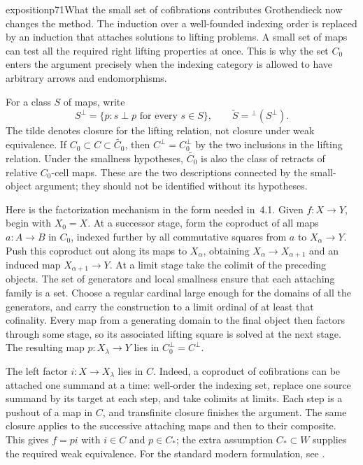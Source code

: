 \begin{dcomment}{exposition}{p71}{What the small set of cofibrations contributes}
Grothendieck now changes the method. The induction over a well-founded indexing order is replaced by an induction that attaches solutions to lifting problems. A small set of maps can test all the required right lifting properties at once. This is why the set $C_0$ enters the argument precisely when the indexing category is allowed to have arbitrary arrows and endomorphisms.

For a class $S$ of maps, write
\[
 S^{\perp}=\{p:s\mathrel{\perp}p\text{ for every }s\in S\},
 \qquad
 \widetilde S={}^{\perp}(S^{\perp}).
\]
The tilde denotes closure for the lifting relation, not closure under weak equivalence. If $C_0\subset C\subset\widetilde{C_0}$, then $C^{\perp}=C_0^{\perp}$ by the two inclusions in the lifting relation. Under the smallness hypotheses, $\widetilde{C_0}$ is also the class of retracts of relative $C_0$-cell maps. These are the two descriptions connected by the small-object argument; they should not be identified without its hypotheses.

Here is the factorization mechanism in the form needed in~4.1. Given $f:X\to Y$, begin with $X_0=X$. At a successor stage, form the coproduct of all maps $a:A\to B$ in $C_0$, indexed further by all commutative squares from $a$ to $X_\alpha\to Y$. Push this coproduct out along its maps to $X_\alpha$, obtaining $X_\alpha\to X_{\alpha+1}$ and an induced map $X_{\alpha+1}\to Y$. At a limit stage take the colimit of the preceding objects. The set of generators and local smallness ensure that each attaching family is a set. Choose a regular cardinal large enough for the domains of all the generators, and carry the construction to a limit ordinal of at least that cofinality. Every map from a generating domain to the final object then factors through some stage, so its associated lifting square is solved at the next stage. The resulting map $p:X_\lambda\to Y$ lies in $C_0^{\perp}=C^{\perp}$.

The left factor $i:X\to X_\lambda$ lies in $C$. Indeed, a coproduct of cofibrations can be attached one summand at a time: well-order the indexing set, replace one source summand by its target at each step, and take colimits at limits. Each step is a pushout of a map in $C$, and transfinite closure finishes the argument. The same closure applies to the successive attaching maps and then to their composite. This gives $f=pi$ with $i\in C$ and $p\in C_*$; the extra assumption $C_*\subset W$ supplies the required weak equivalence. For the standard modern formulation, see \citet[Theorem~12.2.2 and Corollary~12.2.4]{Riehl2014}.


\end{dcomment}
